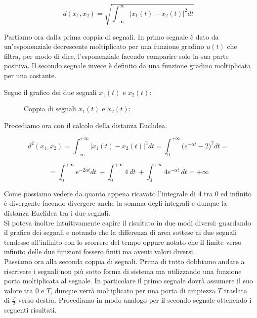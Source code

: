\documentclass[../main.tex]{subfiles}
\begin{document}
\begin{equation}
	d(x_1,x_2) = \sqrt{\int_{-\infty}^\infty \big| x_1(t) - x_2(t)\big|^2 dt}
\end{equation}

Partiamo ora dalla prima coppia di segnali. 
In primo segnale è dato da un'esponenziale decrescente moltiplicato per una funzione gradino $u(t)$ che filtra, per modo di dire, l'esponenziale facendo comparire solo la sua parte positiva. Il secondo segnale invece è definito da una funzione gradino moltiplicata per una costante.

Segue il grafico dei due segnali $x_1(t)$ e $x_2(t)$:

\begin{figure}
\begin{center}

\label{f}
\caption{Coppia di segnali $x_1(t)$ e $x_2(t)$:}	
\end{center}	
\end{figure}

Procediamo ora con il calcolo della distanza Euclidea.

\begin{equation}
	d^2(x_1, x_2) = \int_{-\infty}^{+\infty} \big| x_1(t) - x_2(t)\big|^2 dt = \int_{0}^{+\infty} \big( e^{-\alpha t} - 2\big)^2 dt = 
\end{equation}

\begin{equation}
	= \int_0^{+\infty} e^{-2\alpha t} dt\: + \int_0^{+\infty} 4\: dt\: + \int_0^{+\infty} 4 e^{-\alpha t} \:dt = + \infty
\end{equation}

Come possiamo vedere da quanto appena ricavato l'integrale di 4 tra 0 ed infinito è divergente facendo divergere anche la somma degli integrali e dunque la distanza Euclidea tra i due segnali.\\

Si poteva inoltre intuitivamente capire il risultato in due modi diversi: guardando il grafico dei segnali e notando che la differenza di area sottese ai due segnali tendesse all'infinito con lo scorrere del tempo oppure notato che il limite verso infinito delle due funzioni fossero finiti ma aventi valori diversi.\\

Passiamo ora alla seconda coppia di segnali. Prima di tutto dobbiamo andare a riscrivere i segnali non più sotto forma di sistema ma utilizzando una funzione porta moltiplicata al segnale.
In particolare il primo segnale dovrà assumere il suo valore tra 0 e $T$, dunque verrà moltiplicato per una porta di ampiezza $T$ traslata di $\frac{T}{2}$ verso destra. Procediamo in modo analogo per il secondo segnale ottenendo i seguenti risultati.
\end{document}
